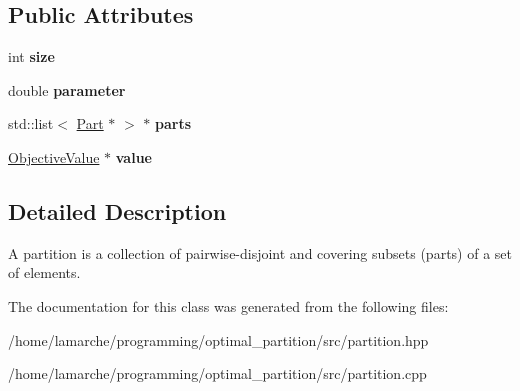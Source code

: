\subsection*{Public Attributes}
\begin{DoxyCompactItemize}
\item 
\hypertarget{classPartition_a718bdba639f222d90d23480b58caa1f9}{int {\bfseries size}}\label{classPartition_a718bdba639f222d90d23480b58caa1f9}

\item 
\hypertarget{classPartition_a1125b9b5548fa65e98a6dd94279c53bc}{double {\bfseries parameter}}\label{classPartition_a1125b9b5548fa65e98a6dd94279c53bc}

\item 
\hypertarget{classPartition_a887cae6498c54754779d7956b48e8d3e}{std\-::list$<$ \hyperlink{classPart}{Part} $\ast$ $>$ $\ast$ {\bfseries parts}}\label{classPartition_a887cae6498c54754779d7956b48e8d3e}

\item 
\hypertarget{classPartition_acb93c172b3e9a1bb4c6e0b1c5a50a13d}{\hyperlink{classObjectiveValue}{Objective\-Value} $\ast$ {\bfseries value}}\label{classPartition_acb93c172b3e9a1bb4c6e0b1c5a50a13d}

\end{DoxyCompactItemize}


\subsection{Detailed Description}
A partition is a collection of pairwise-\/disjoint and covering subsets (parts) of a set of elements. 

The documentation for this class was generated from the following files\-:\begin{DoxyCompactItemize}
\item 
/home/lamarche/programming/optimal\-\_\-partition/src/partition.\-hpp\item 
/home/lamarche/programming/optimal\-\_\-partition/src/partition.\-cpp\end{DoxyCompactItemize}
